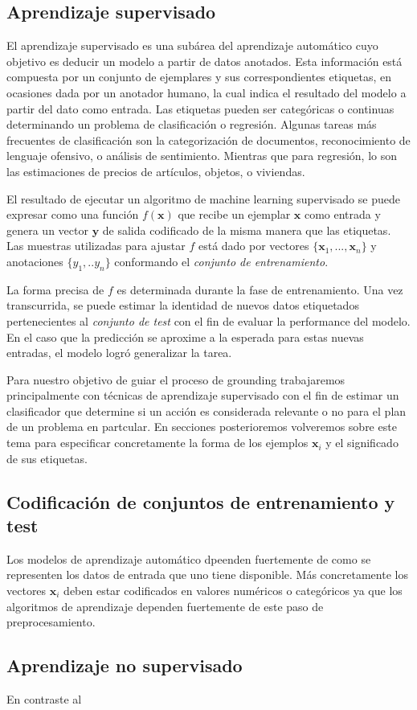 \newcommand{\vect}[1]{\boldsymbol{#1}}

\subsection{Aprendizaje supervisado}

El aprendizaje supervisado es una subárea del aprendizaje automático cuyo
objetivo es deducir un modelo a partir de datos anotados. Esta información está
compuesta por un conjunto de ejemplares y sus correspondientes etiquetas, en
ocasiones dada por un anotador humano, la cual indica el resultado del modelo a
partir del dato como entrada. Las etiquetas pueden ser categóricas o continuas
determinando un problema de clasificación o regresión. Algunas tareas más
frecuentes de clasificación son la categorización de documentos, reconocimiento
de lenguaje ofensivo, o análisis de sentimiento. Mientras que para regresión, lo
son las estimaciones de precios de artículos, objetos, o viviendas.

El resultado de ejecutar un algoritmo de machine learning supervisado se puede
expresar como una función $f(\vect{x})$ que recibe un ejemplar $\vect{x}$ como
entrada y genera un vector $\vect{y}$ de salida codificado de la misma manera
que las etiquetas. Las muestras utilizadas para ajustar $f$ está dado por
vectores $\{\vect{x}_1, ..., \vect{x}_n\}$ y anotaciones $\{y_1, .. y_n\}$
conformando el \emph{conjunto de entrenamiento}.

La forma precisa de $f$ es determinada durante la fase de entrenamiento. Una vez
transcurrida, se puede estimar la identidad de nuevos datos etiquetados
pertenecientes al \emph{conjunto de test} con el fin de evaluar la performance
del modelo. En el caso que la predicción se aproxime a la esperada para estas
nuevas entradas, el modelo logró generalizar la tarea.

Para nuestro objetivo de guiar el proceso de grounding trabajaremos
principalmente con técnicas de aprendizaje supervisado con el fin de estimar un
clasificador que determine si un acción es considerada relevante o no para el
plan de un problema en partcular. En secciones posterioremos volveremos sobre
este tema para especificar concretamente la forma de los ejemplos $\vect{x}_i$ y
el significado de sus etiquetas. 

\subsection{Codificación de conjuntos de entrenamiento y test}

Los modelos de aprendizaje automático dpeenden fuertemente de como se
representen los datos de entrada que uno tiene disponible. Más concretamente los
vectores $\vect{x}_i$ deben estar codificados en valores numéricos o categóricos
ya que los algoritmos de aprendizaje dependen fuertemente de este paso de
preprocesamiento.



\subsection{Aprendizaje no supervisado}

En contraste al 
